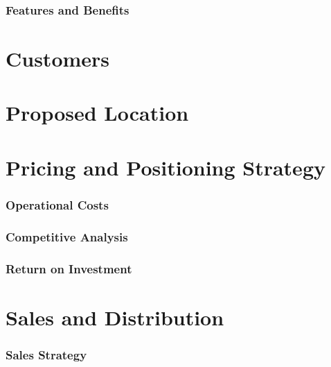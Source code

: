 \subsubsection*{Features and Benefits}


\section{Customers}


\section{Proposed Location}


\section{Pricing and Positioning Strategy}


\subsubsection{Operational Costs}


\subsubsection{Competitive Analysis}


\subsubsection{Return on Investment}


\section{Sales and Distribution}

\subsubsection{Sales Strategy}

